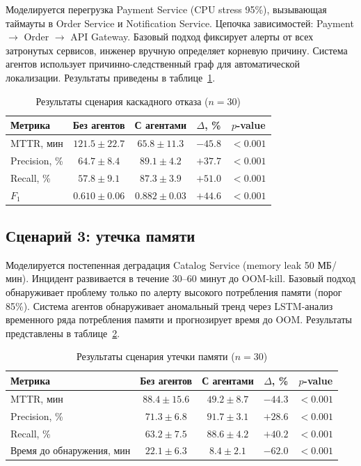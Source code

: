 Моделируется перегрузка Payment Service (CPU stress 95\%), вызывающая таймауты в Order Service и Notification Service. Цепочка зависимостей: Payment $\to$ Order $\to$ API Gateway. Базовый подход фиксирует алерты от всех затронутых сервисов, инженер вручную определяет корневую причину. Система агентов использует причинно-следственный граф для автоматической локализации. Результаты приведены в таблице~\ref{tab:scenario2_results}.

\begin{table}[H]
\centering
\caption{Результаты сценария каскадного отказа ($n = 30$)}
\label{tab:scenario2_results}
\begin{tabular}{|l|c|c|c|c|}
\hline
\textbf{Метрика} & \textbf{Без агентов} & \textbf{С агентами} & \textbf{$\Delta$, \%} & \textbf{$p$-value} \\
\hline
MTTR, мин & $121.5 \pm 22.7$ & $65.8 \pm 11.3$ & $-45.8$ & $< 0.001$ \\
\hline
Precision, \% & $64.7 \pm 8.4$ & $89.1 \pm 4.2$ & $+37.7$ & $< 0.001$ \\
\hline
Recall, \% & $57.8 \pm 9.1$ & $87.3 \pm 3.9$ & $+51.0$ & $< 0.001$ \\
\hline
$F_1$ & $0.610 \pm 0.06$ & $0.882 \pm 0.03$ & $+44.6$ & $< 0.001$ \\
\hline
\end{tabular}
\end{table}

\subsection{Сценарий 3: утечка памяти}

Моделируется постепенная деградация Catalog Service (memory leak 50 МБ/мин). Инцидент развивается в течение 30--60 минут до OOM-kill. Базовый подход обнаруживает проблему только по алерту высокого потребления памяти (порог 85\%). Система агентов обнаруживает аномальный тренд через LSTM-анализ временного ряда потребления памяти и прогнозирует время до OOM. Результаты представлены в таблице~\ref{tab:scenario3_results}.

\begin{table}[H]
\centering
\caption{Результаты сценария утечки памяти ($n = 30$)}
\label{tab:scenario3_results}
\begin{tabular}{|l|c|c|c|c|}
\hline
\textbf{Метрика} & \textbf{Без агентов} & \textbf{С агентами} & \textbf{$\Delta$, \%} & \textbf{$p$-value} \\
\hline
MTTR, мин & $88.4 \pm 15.6$ & $49.2 \pm 8.7$ & $-44.3$ & $< 0.001$ \\
\hline
Precision, \% & $71.3 \pm 6.8$ & $91.7 \pm 3.1$ & $+28.6$ & $< 0.001$ \\
\hline
Recall, \% & $63.2 \pm 7.5$ & $88.6 \pm 4.2$ & $+40.2$ & $< 0.001$ \\
\hline
Время до обнаружения, мин & $22.1 \pm 6.3$ & $8.4 \pm 2.1$ & $-62.0$ & $< 0.001$ \\
\hline
\end{tabular}
\end{table}

